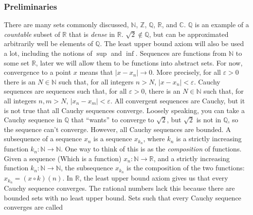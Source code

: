 \documentclass[crop=false,class=article,oneside]{standalone}
\begin{document}
        \subsubsection{Preliminaries}
            There are many sets commonly discussed,
            $\mathbb{N}$, $\mathbb{Z}$, $\mathbb{Q}$,
            $\mathbb{R}$, and $\mathbb{C}$.
            $\mathbb{Q}$ is an example of a
            \textit{countable} subset of $\mathbb{R}$ that is
            \textit{dense} in $\mathbb{R}$.
            $\sqrt{2}\notin\mathbb{Q}$, but can be approximated
            arbitrarily well be elements of $\mathbb{Q}$.
            The least upper bound axiom will also be used a lot,
            including the notions of $\sup$ and $\inf$. Sequences
            are functions from $\mathbb{N}$ to some set
            $\mathbb{R}$, later we will allow them to be functions
            into abstract sets. For now, convergence to a point $x$
            means that $|x-x_{n}|\rightarrow{0}$. More precisely,
            for all $\varepsilon>0$ there is an $N\in\mathbb{N}$
            such that, for all integers $n>N$,
            $|x-x_{n}|<\varepsilon$. Cauchy sequences are
            sequences such that, for all $\varepsilon>0$, there
            is an $N\in\mathbb{N}$ such that, for all integers
            $n,m>N$, $|x_{n}-x_{m}|<\varepsilon$. All convergent
            sequences are Cauchy, but it is not true that all
            Cauchy sequences converge. Loosely speaking, you can
            take a Cauchy sequence in $\mathbb{Q}$ that ``wants''
            to converge to $\sqrt{2}$, but $\sqrt{2}$ is not
            in $\mathbb{Q}$, so the sequence can't converge.
            However, all Cauchy sequences are bounded. A
            subsequence of a sequence $x_{n}$ is a sequence
            $x_{k_{n}}$, where $k_{n}$ is a strictly increasing
            function $k_{n}:\mathbb{N}\rightarrow\mathbb{N}$. One
            way to think of this is as the \textit{composition}
            of functions. Given a sequence (Which is a function)
            $x_{n}:\mathbb{N}\rightarrow\mathbb{R}$, and a
            strictly increasing function
            $k_{n}:\mathbb{N}\rightarrow\mathbb{N}$, the subsequence
            $x_{k_{n}}$ is the composition of the two functions:
            $x_{k_{n}}=(x\circ{k})(n)$.
            In $\mathbb{R}$, the least upper bound axiom gives
            us that every Cauchy sequence converges. The
            rational numbers lack this because there are
            bounded sets with no least upper bound. Sets such
            that every Cauchy sequence converges are called
\end{document}
